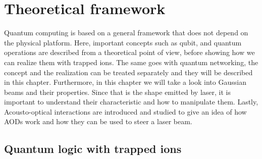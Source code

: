 
\chapter{Theoretical framework}
Quantum computing is based on a general framework that does not depend on the physical platform. Here, important concepts such as qubit, and quantum operations are described from a theoretical point of view, before showing how we can realize them with trapped ions. The same goes with quantum networking, the concept and the realization can be treated separately and they will be described in this chapter. Furthermore, in this chapter we will take a look into Gaussian beams and their properties. Since that is the shape emitted by laser, it is important to understand their characteristic and how to manipulate them. Lastly, Acousto-optical interactions are introduced and studied to give an idea of how AODs work and how they can be used to steer a laser beam.
\section{Quantum logic with trapped ions}
